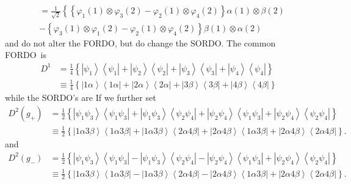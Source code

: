 \documentclass[aps,preprint]{revtex4}%
\begin{document}
\begin{align}
&  =\frac{1}{\sqrt{2}}\left\{  \left\{  \varphi_{1}\left(  1\right)
\otimes\varphi_{3}\left(  2\right)  -\varphi_{2}\left(  1\right)
\otimes\varphi_{4}\left(  2\right)  \right\}  \alpha\left(  1\right)
\otimes\beta\left(  2\right)  \right. \nonumber\\
&  -\left\{  \varphi_{3}\left(  1\right)  \otimes\varphi_{1}\left(  2\right)
-\varphi_{2}\left(  1\right)  \otimes\varphi_{4}\left(  2\right)  \right\}
\beta\left(  1\right)  \otimes\alpha\left(  2\right)
\end{align}
and do not alter the FORDO, but do change the SORDO. The common FORDO\ is
\begin{align}
D^{1}  &  =\frac{1}{4}\left\{  \left\vert \psi_{1}\right\rangle \left\langle
\psi_{1}\right\vert +\left\vert \psi_{2}\right\rangle \left\langle \psi
_{2}\right\vert +\left\vert \psi_{3}\right\rangle \left\langle \psi
_{3}\right\vert +\left\vert \psi_{4}\right\rangle \left\langle \psi
_{4}\right\vert \right\} \nonumber\\
&  \equiv\frac{1}{4}\left\{  \left\vert 1\alpha\right\rangle \left\langle
1\alpha\right\vert +\left\vert 2\alpha\right\rangle \left\langle
2\alpha\right\vert +\left\vert 3\beta\right\rangle \left\langle 3\beta
\right\vert +\left\vert 4\beta\right\rangle \left\langle 4\beta\right\vert
\right\}
\end{align}
while the SORDO's are If we further set%
\begin{align}
D^{2}\left(  g_{+}\right)   &  =\frac{1}{2}\left\{  \left\vert \psi_{1}%
\psi_{3}\right\rangle \left\langle \psi_{1}\psi_{3}\right\vert +\left\vert
\psi_{1}\psi_{3}\right\rangle \left\langle \psi_{2}\psi_{4}\right\vert
+\left\vert \psi_{2}\psi_{4}\right\rangle \left\langle \psi_{1}\psi
_{3}\right\vert +\left\vert \psi_{2}\psi_{4}\right\rangle \left\langle
\psi_{2}\psi_{4}\right\vert \right\} \nonumber\\
&  \equiv\frac{1}{2}\left\{  \left\vert 1\alpha3\beta\right\rangle
\left\langle 1\alpha3\beta\right\vert +\left\vert 1\alpha3\beta\right\rangle
\left\langle 2\alpha4\beta\right\vert +\left\vert 2\alpha4\beta\right\rangle
\left\langle 1\alpha3\beta\right\vert +\left\vert 2\alpha4\beta\right\rangle
\left\langle 2\alpha4\beta\right\vert \right\}  .
\end{align}
and
\begin{align}
D^{2}\left(  g_{-}\right)   &  =\frac{1}{2}\left\{  \left\vert \psi_{1}%
\psi_{3}\right\rangle \left\langle \psi_{1}\psi_{3}\right\vert -\left\vert
\psi_{1}\psi_{3}\right\rangle \left\langle \psi_{2}\psi_{4}\right\vert
-\left\vert \psi_{2}\psi_{4}\right\rangle \left\langle \psi_{1}\psi
_{3}\right\vert +\left\vert \psi_{2}\psi_{4}\right\rangle \left\langle
\psi_{2}\psi_{4}\right\vert \right\} \nonumber\\
&  \equiv\frac{1}{2}\left\{  \left\vert 1\alpha3\beta\right\rangle
\left\langle 1\alpha3\beta\right\vert -\left\vert 1\alpha3\beta\right\rangle
\left\langle 2\alpha4\beta\right\vert -\left\vert 2\alpha4\beta\right\rangle
\left\langle 1\alpha3\beta\right\vert +\left\vert 2\alpha4\beta\right\rangle
\left\langle 2\alpha4\beta\right\vert \right\}  .
\end{align}%
\end{document}
